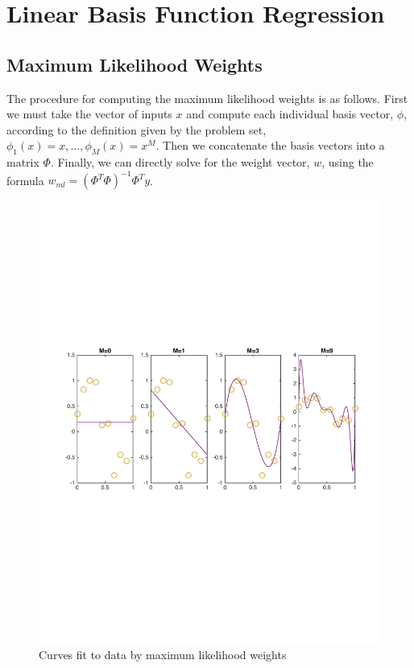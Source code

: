 \documentclass[10pt,twocolumn]{article}
\begin{document}
\section{Linear Basis Function Regression}

\subsection*{Maximum Likelihood Weights}

The procedure for computing the maximum likelihood weights is as follows. First we must take the vector of inputs $x$ and compute each individual basis vector, $\phi$, according to the definition given by the problem set, $\phi_1(x) = x, ... , \phi_M(x) = x^M$. Then we concatenate the basis vectors into a matrix $\Phi$. Finally, we can directly solve for the weight vector, $w$, using the formula $w_{ml} = (\Phi^T  \Phi)^{-1}  \Phi^T y$.

\begin{figure}[b]
\center
\includegraphics[scale =.4]{ML_weight.pdf}
\caption{Curves fit to data by maximum likelihood weights}
\end{figure}
\end{document}
